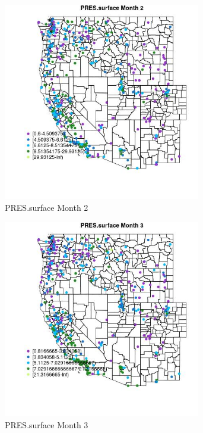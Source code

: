 \begin{figure} 
\centering  
\includegraphics[width=0.77\textwidth]{Code_Outputs/ML_input_report_ML_input_PM25_Step5_part_d_de_duplicated_aves_ML_input_MapObsMo2PRESsurface.jpg} 
\caption{\label{fig:ML_input_report_ML_input_PM25_Step5_part_d_de_duplicated_aves_ML_inputMapObsMo2PRESsurface}PRES.surface Month 2} 
\end{figure} 
 

\begin{figure} 
\centering  
\includegraphics[width=0.77\textwidth]{Code_Outputs/ML_input_report_ML_input_PM25_Step5_part_d_de_duplicated_aves_ML_input_MapObsMo3PRESsurface.jpg} 
\caption{\label{fig:ML_input_report_ML_input_PM25_Step5_part_d_de_duplicated_aves_ML_inputMapObsMo3PRESsurface}PRES.surface Month 3} 
\end{figure} 
 

